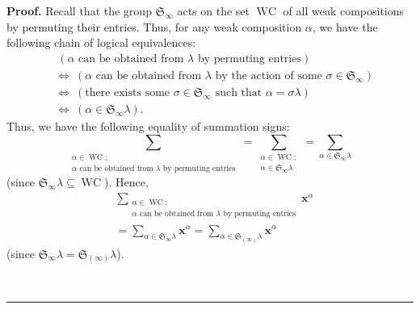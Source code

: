 \documentclass[numbers=enddot,12pt,final,onecolumn,notitlepage]{scrartcl}%
\theoremstyle{definition}
\newenvironment{proof}[1][Proof]{\noindent\textbf{#1.} }{\ \rule{0.5em}{0.5em}}
\let\sumnonlimits\sum
\renewcommand{\sum}{\sumnonlimits\limits}
\newenvironment{verlong}{}{}
\begin{document}
\begin{verlong}
\begin{proof}
Recall that the group $\mathfrak{S}_{\infty}$ acts on the set
$\operatorname*{WC}$ of all weak compositions by permuting their entries.
Thus, for any weak composition $\alpha$, we have the following chain of
logical equivalences:%
\begin{align*}
&  \ \left(  \alpha\text{ can be obtained from }\lambda\text{ by permuting
entries}\right) \\
&  \Longleftrightarrow\ \left(  \alpha\text{ can be obtained from }%
\lambda\text{ by the action of some }\sigma\in\mathfrak{S}_{\infty}\right) \\
&  \Longleftrightarrow\ \left(  \text{there exists some }\sigma\in
\mathfrak{S}_{\infty}\text{ such that }\alpha=\sigma\lambda\right) \\
&  \Longleftrightarrow\ \left(  \alpha\in\mathfrak{S}_{\infty}\lambda\right)
.
\end{align*}
Thus, we have the following equality of summation signs:%
\begin{equation}
\sum_{\substack{\alpha\in\operatorname*{WC};\\\alpha\text{ can be obtained
from }\lambda\text{ by permuting entries}}}=\sum_{\substack{\alpha
\in\operatorname*{WC};\\\alpha\in\mathfrak{S}_{\infty}\lambda}}=\sum
_{\alpha\in\mathfrak{S}_{\infty}\lambda}
\label{pf.prop.proofs.mlam-eq.sum=sum}%
\end{equation}
(since $\mathfrak{S}_{\infty}\lambda\subseteq\operatorname*{WC}$). Hence,%
\begin{align}
&  \sum_{\substack{\alpha\in\operatorname*{WC};\\\alpha\text{ can be obtained
from }\lambda\text{ by permuting entries}}}\mathbf{x}^{\alpha}\nonumber\\
&  =\sum_{\alpha\in\mathfrak{S}_{\infty}\lambda}\mathbf{x}^{\alpha}%
=\sum_{\alpha\in\mathfrak{S}_{\left(  \infty\right)  }\lambda}\mathbf{x}%
^{\alpha} \label{pf.prop.proofs.mlam-eq.1}%
\end{align}
(since $\mathfrak{S}_{\infty}\lambda=\mathfrak{S}_{\left(  \infty\right)
}\lambda$).


\end{proof}
\end{verlong}
\end{document}
